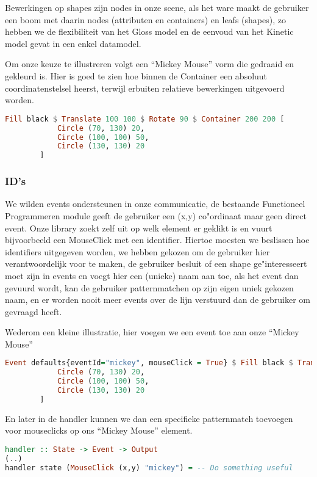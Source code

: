 Bewerkingen op shapes zijn nodes in onze scene, als het ware maakt de gebruiker een boom met daarin nodes (attributen en containers) en leafs (shapes), zo hebben we de flexibiliteit van het Gloss model en de eenvoud van het Kinetic model gevat in een enkel datamodel.

Om onze keuze te illustreren volgt een ``Mickey Mouse'' vorm die gedraaid en gekleurd is. Hier is goed te zien hoe binnen de Container een absoluut coordinatenstelsel heerst, terwijl erbuiten relatieve bewerkingen uitgevoerd worden.

\begin{lstlisting}[style=densecode, language=Haskell]
Fill black $ Translate 100 100 $ Rotate 90 $ Container 200 200 [
            Circle (70, 130) 20,
            Circle (100, 100) 50,
            Circle (130, 130) 20
        ]
\end{lstlisting}

\subsubsection{ID's}

We wilden events ondersteunen in onze communicatie, de bestaande Functioneel Programmeren module geeft de gebruiker een (x,y) co"ordinaat maar geen direct event. Onze library zoekt zelf uit op welk element er geklikt is en vuurt bijvoorbeeld een MouseClick met een identifier. Hiertoe moesten we beslissen hoe identifiers uitgegeven worden, we hebben gekozen om de gebruiker hier verantwoordelijk voor te maken, de gebruiker besluit of een shape ge"interesseert moet zijn in events en voegt hier een (unieke) naam aan toe, als het event dan gevuurd wordt, kan de gebruiker patternmatchen op zijn eigen uniek gekozen naam, en er worden nooit meer events over de lijn verstuurd dan de gebruiker om gevraagd heeft.

Wederom een kleine illustratie, hier voegen we een event toe aan onze ``Mickey Mouse''
\begin{lstlisting}[style=densecode, language=Haskell]
Event defaults{eventId="mickey", mouseClick = True} $ Fill black $ Translate 100 100 $ Rotate 90 $ Container 200 200 [
            Circle (70, 130) 20,
            Circle (100, 100) 50,
            Circle (130, 130) 20
        ]
\end{lstlisting}

En later in de handler kunnen we dan een specifieke patternmatch toevoegen voor mouseclicks op ons ``Mickey Mouse'' element.
\begin{lstlisting}[style=densecode, language=Haskell]
handler :: State -> Event -> Output
(..)
handler state (MouseClick (x,y) "mickey") = -- Do something useful
\end{lstlisting}

